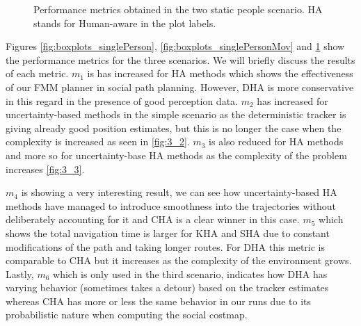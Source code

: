 \begin{figure}[t!]
%
%

\caption{Performance metrics obtained in the two static people scenario. HA stands for Human-aware in the plot labels.}
\label{fig:boxplots_2people}
\end{figure}


Figures \ref{fig:boxplots_singlePerson}, \ref{fig:boxplots_singlePersonMov} and \ref{fig:boxplots_2people} show the performance metrics for the three scenarios. We will briefly discuss the results of each metric. $m_{1}$ is has increased for HA methods which shows the effectiveness of our FMM planner in social path planning. However, DHA is more conservative in this regard in the presence of good perception data. $m_{2}$ has increased for uncertainty-based methods in the simple scenario as the deterministic tracker is giving already good position estimates, but this is no longer the case when the complexity is increased as seen in \ref{fig:3_2}. $m_{3}$ is also reduced for HA methods and more so for uncertainty-base HA methods as the complexity of the problem increases \ref{fig:3_3}.


 $m_{4}$ is showing a very interesting result, we can see how uncertainty-based HA methods have managed to introduce smoothness into the trajectories without deliberately accounting for it and CHA is a clear winner in this case. $m_{5}$ which shows the total navigation time is larger for  KHA and SHA due to constant modifications of the path and taking longer routes. For DHA this metric is comparable to CHA but it increases as the complexity of the environment grows. Lastly, $m_{6}$ which is only used in the third scenario, indicates how DHA has varying behavior (sometimes takes a detour) based on the tracker estimates whereas CHA has more or less the same behavior in our runs due to its probabilistic nature when computing the social costmap.     



